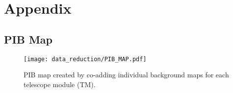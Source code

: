 \chapter{Appendix}
\section{PIB Map}\label{sec:appendix_a_pib_map}
\begin{figure}[htbp]
    \centering
    \texttt{[image: data\_reduction/PIB\_MAP.pdf]}
    \caption{PIB map created by co-adding individual background maps for each telescope module (TM).}
    \label{fig:pib_map}
\end{figure}
